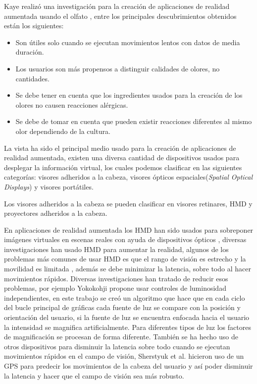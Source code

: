 \documentclass[12pt,a4paper,spanish,openany]{book}
\begin{document}
Kaye realizó una investigación para la creación de aplicaciones de realidad
aumentada usando el olfato  \cite{Kaye:2004:MSA:962342.964333}, entre los
principales descubrimientos obtenidos están los siguientes:
\begin{itemize}
  \item Son útiles solo cuando se ejecutan movimientos lentos con datos de media
  duración.
  \item Los usuarios son más propensos a distinguir calidades de olores, no
  cantidades.
  \item Se debe tener en cuenta que los ingredientes usados para la creación de
  los olores no causen reacciones alérgicas.
  \item Se debe de tomar en cuenta que pueden existir reacciones diferentes al
  mismo olor dependiendo de la cultura.   
\end{itemize}


La vista ha sido el principal medio usado para la creación de aplicaciones de
realidad aumentada, existen una diversa cantidad de dispositivos usados para
desplegar la información virtual, los cuales podemos clasificar en las siguientes
categorías: visores adheridos a la cabeza, visores ópticos
espaciales(\emph{Spatial Optical Displays}) y visores portátiles.

Los visores adheridos a la cabeza se pueden clasificar en visores
retinares, HMD y proyectores adheridos a la cabeza.


En aplicaciones de realidad aumentada los HMD han sido usados para sobreponer
imágenes virtuales en escenas reales con ayuda de dispositivos
ópticos \cite{Yokokohji:2000:AIO:832288.835786}, diversas
investigaciones han usado HMD para aumentar la realidad, algunos de los
problemas más comunes de usar HMD es que el rango de visión es estrecho y la
movilidad es limitada \cite{Sherstyuk:2009:DLA:1643928.1643982}, además se
debe minimizar la latencia, sobre todo al hacer movimientos rápidos. Diversas
investigaciones han tratado de reducir esos problemas, por ejemplo Yokokohji
propone usar controles de luminosidad independientes, en este trabajo se creó
un algoritmo que hace que en cada ciclo del bucle principal de gráficas cada
fuente de luz se compare con la posición y orientación del usuario, si la
fuente de luz se encuentra enfocada hacia el usuario la intensidad se magnifica
artificialmente. Para diferentes tipos de luz los factores de magnificación se
procesan de forma diferente. También se ha hecho uso de otros dispositivos para
disminuir la latencia sobre todo cuando se ejecutan movimientos rápidos en el
campo de visión, Sherstyuk et al. hicieron uso de un GPS para predecir los
movimientos de la cabeza del usuario y así poder disminuir la latencia y hacer
que el campo de visión sea más robusto.
\end{document}
